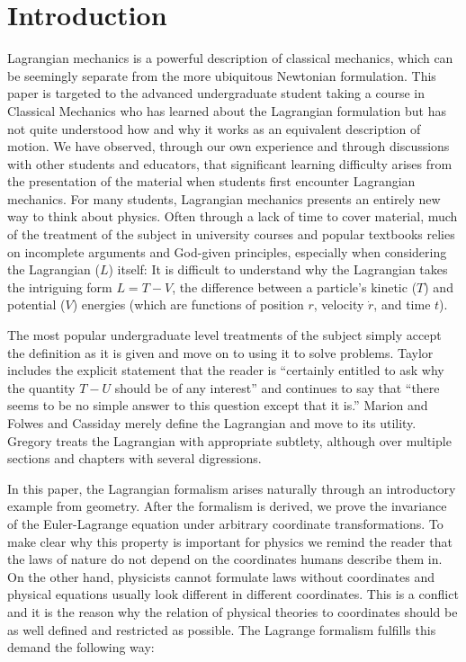 \documentclass[prb,preprint]{revtex4-1}
\begin{document}
\maketitle



\section{Introduction}\label{introduction}

Lagrangian mechanics is a powerful description of classical mechanics, which can be seemingly separate from the more ubiquitous Newtonian formulation. This paper is targeted to the advanced undergraduate student taking a course in Classical Mechanics who has learned about the Lagrangian formulation but has not quite understood how and why it works as an equivalent description of motion. We have observed, through our own experience and through discussions with other students and educators, that significant learning difficulty arises from the presentation of the material when students first encounter Lagrangian mechanics. For many students, Lagrangian mechanics presents an entirely new way to think about physics. Often through a lack of time to cover material, much of the treatment of the subject in university courses and popular textbooks relies on incomplete arguments and God-given principles, especially when considering the Lagrangian ($L$) itself: It is difficult to understand why the Lagrangian takes the intriguing form $L=T-V$, the difference between a particle's kinetic ($T$) and potential ($V$) energies (which are functions of position $r$, velocity $\dot{r}$, and time $t$). 

The most popular undergraduate level treatments of the subject simply accept the definition as it is given and move on to using it to solve problems. Taylor\cite[p.~238]{taylor2005classical} includes the explicit statement that the reader is ``certainly entitled to ask why the quantity $T-U$ should be of any interest'' and continues to say that ``there seems to be no simple answer to this question except that it is.'' Marion \cite[p.~198-199]{marion1970classical} and Folwes and Cassiday \cite[p.~393]{fowles1999analytical} merely define the Lagrangian and move to its utility. Gregory\cite[p.~348]{gregory2006classical} treats the Lagrangian with appropriate subtlety, although over multiple sections and chapters with several digressions.

In this paper, the Lagrangian formalism arises naturally through an introductory example from geometry. After the formalism is derived, we prove the invariance of the Euler-Lagrange equation under arbitrary coordinate transformations. To make clear why this property is important for physics we remind the reader that the laws of nature do not depend on the coordinates humans describe them in. On the other hand, physicists cannot formulate laws without coordinates and physical equations usually look different in different coordinates. This is a conflict and it is the reason why the relation of physical theories to coordinates should be as well defined and restricted as possible. The Lagrange formalism fulfills this demand the following way: 
\end{document}
